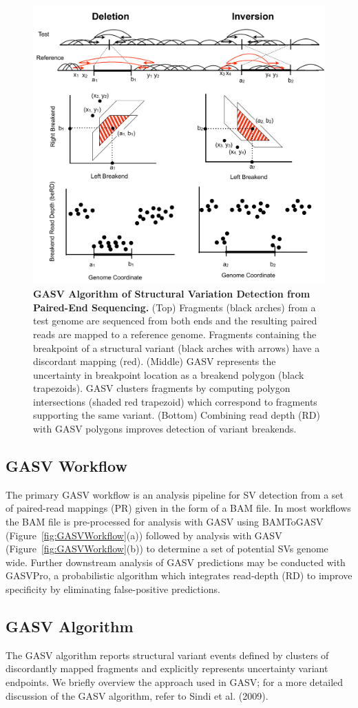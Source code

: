 \documentclass[11pt]{article}
\begin{document}
\begin{figure}
\includegraphics[width = 0.60 \textwidth] {Figures/GASV_Illustration.pdf} %
\caption{\textbf{GASV Algorithm of Structural Variation Detection from Paired-End Sequencing.}  (Top) Fragments (black arches) from a test genome are sequenced from both ends and the resulting paired reads are mapped to a reference genome. Fragments containing the breakpoint of a structural variant (black arches with arrows) have a discordant mapping (red).  (Middle) GASV represents the uncertainty in breakpoint location as a breakend polygon (black trapezoids). GASV clusters fragments by computing polygon intersections (shaded red trapezoid) which correspond to fragments supporting the same variant. (Bottom) Combining read depth (RD) with GASV polygons improves detection of variant breakends.}
   \label{fig:illustration}
\end{figure}

\subsection{GASV Workflow}

The primary GASV workflow is an analysis pipeline for SV detection from a set of paired-read mappings (PR) given in the form of a BAM file. In most workflows the BAM file is pre-processed for analysis with GASV using BAMToGASV (Figure~\ref{fig:GASVWorkflow}(a)) followed by analysis with GASV (Figure~\ref{fig:GASVWorkflow}(b)) to determine a set of potential SVs genome wide. Further downstream analysis of GASV predictions may be conducted with GASVPro, a probabilistic algorithm which integrates read-depth (RD) to improve specificity by eliminating false-positive predictions. 

\subsection{GASV Algorithm}
The GASV algorithm reports structural variant events defined by clusters of discordantly mapped fragments and explicitly represents uncertainty variant endpoints. We briefly overview the approach used in GASV; for a more detailed discussion of the GASV algorithm, refer to Sindi et al. (2009).
\end{document}
